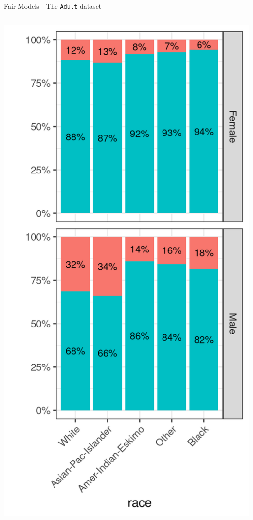 \begin{frame}{Fair Models - The \texttt{Adult} dataset}
\begin{columns}
\begin{column}{0.6\textwidth}
\includegraphics[scale = 0.45]{images/dataset_adult_race.png}%

\end{column}
\end{columns}
\end{frame}
